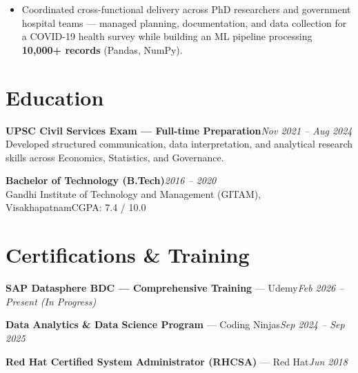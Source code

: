 \documentclass[10pt, letterpaper]{article}
\begin{document}
\begin{itemize}
  \item Coordinated cross-functional delivery across PhD researchers and government hospital teams — managed planning, documentation, and data collection for a COVID-19 health survey while building an ML pipeline processing \textbf{10,000+ records} (Pandas, NumPy).
\end{itemize}

\section{Education}

{\bfseries UPSC Civil Services Exam — Full-time Preparation}\hfill{\small\color{muted}\textit{Nov 2021 – Aug 2024}}\\
{\small\color{muted}Developed structured communication, data interpretation, and analytical research skills across Economics, Statistics, and Governance.}

\vspace{2pt}
{\bfseries Bachelor of Technology (B.Tech)}\hfill{\small\color{muted}\textit{2016 – 2020}}\\
{\small\color{muted}Gandhi Institute of Technology and Management (GITAM), Visakhapatnam\hfill CGPA: 7.4 / 10.0}

\section{Certifications \& Training}

{\bfseries SAP Datasphere BDC — Comprehensive Training} — Udemy\hfill{\small\color{muted}\textit{Feb 2026 – Present \emph{(In Progress)}}}

\vspace{1pt}
{\bfseries Data Analytics \& Data Science Program} — Coding Ninjas\hfill{\small\color{muted}\textit{Sep 2024 – Sep 2025}}

\vspace{1pt}
{\bfseries Red Hat Certified System Administrator (RHCSA)} — Red Hat\hfill{\small\color{muted}\textit{Jun 2018}}

\end{document}
